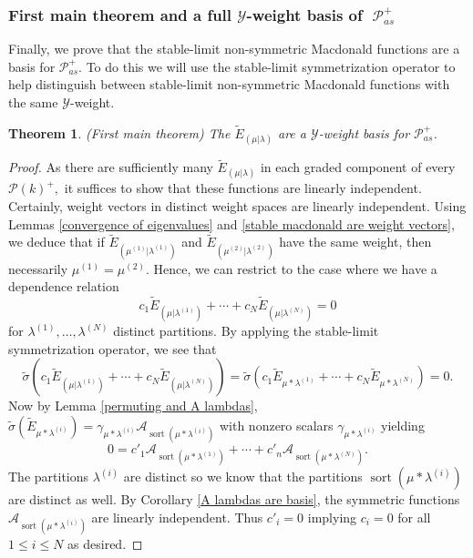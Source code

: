 \documentclass[11pt]{article}
\newtheorem{thm}[theo]{Theorem}
\theoremstyle{definition}
\numberwithin{equation}{section}
\newcommand{\y}{{ \mathscr{Y} }}
\DeclareMathOperator{\sP}{\mathscr{P} }
\DeclareMathOperator{\sort}{sort}
\begin{document}
\subsubsection{First main theorem and a full $\y$-weight basis of $\sP_{as}^{+}$}

Finally, we prove that the stable-limit non-symmetric Macdonald functions are a basis for $\mathscr{P}_{as}^{+}$. To do this we will use the stable-limit symmetrization operator to help distinguish between stable-limit non-symmetric Macdonald functions with the same $\y$-weight. 

\begin{thm}(First main theorem) \label{main theorem}
The $\widetilde{E}_{(\mu|\lambda)}$ are a $\y$-weight basis for $\mathscr{P}_{as}^{+}$.
\end{thm}

\begin{proof}
As there are sufficiently many $\widetilde{E}_{(\mu|\lambda)}$ in each graded component of every $\mathscr{P}(k)^{+},$ it suffices to show that these functions are linearly independent. Certainly, weight vectors in distinct weight spaces are linearly independent. Using Lemmas \ref{convergence of eigenvalues} and \ref{stable macdonald are weight vectors}, we deduce that if $\widetilde{E}_{(\mu^{(1)}|\lambda^{(1)})}$ and $\widetilde{E}_{(\mu^{(2)}|\lambda^{(2)})}$ have the same weight, then necessarily $\mu^{(1)} = \mu^{(2)}$. Hence, we can restrict to the case where we
have a dependence relation
$$ c_1\widetilde{E}_{(\mu|\lambda^{(1)})} +\cdots + c_N \widetilde{E}_{(\mu|\lambda^{(N)})} = 0 $$
for $\lambda^{(1)},\ldots,\lambda^{(N)}$ distinct partitions.
By applying the stable-limit symmetrization operator, we see that 
$$ \widetilde{\sigma}(c_1\widetilde{E}_{(\mu|\lambda^{(1)})} +\cdots + c_N \widetilde{E}_{(\mu|\lambda^{(N)})} ) = \widetilde{\sigma}(c_1\widetilde{E}_{\mu*\lambda^{(1)}} +\cdots+c_N \widetilde{E}_{\mu*\lambda^{(N)}}) = 0 .$$
Now by Lemma \ref{permuting and A lambdas}, $\widetilde{\sigma}(\widetilde{E}_{\mu*\lambda^{(i)}}) = \gamma_{\mu*\lambda^{(i)}}  \mathcal{A}_{\sort(\mu*\lambda^{(i)})} $ with nonzero scalars  $\gamma_{\mu*\lambda^{(i)}}$ yielding 
$$ 0 = c'_1\mathcal{A}_{\sort(\mu*\lambda^{(1)})} +\cdots+ c'_n \mathcal{A}_{\sort(\mu*\lambda^{(N)})}.$$ The partitions $\lambda^{(i)}$ are distinct so we know that the partitions $\sort(\mu*\lambda^{(i)})$ are distinct as well. By Corollary \ref{A lambdas are basis}, the symmetric functions $\mathcal{A}_{\sort(\mu*\lambda^{(i)})}$ are linearly independent. Thus $c'_i = 0$ implying $c_i = 0$ for all $1 
\leq i \leq N$ as desired.
\end{proof}
\end{document}
